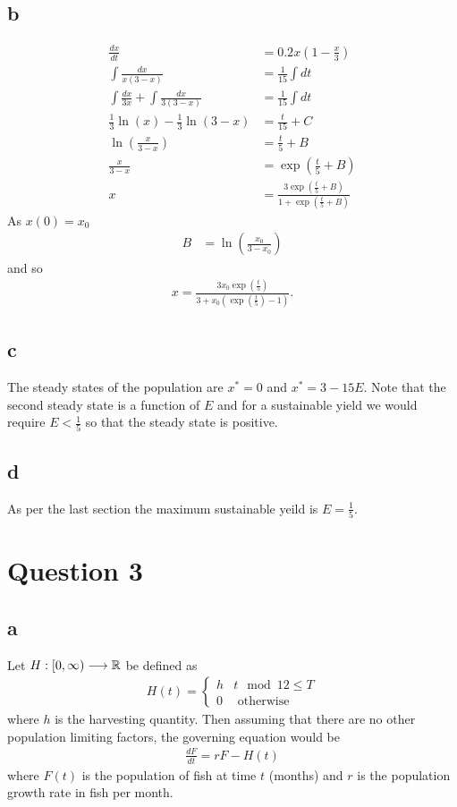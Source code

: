 \documentclass{unswmaths}
\begin{document}
\subsection*{b}
	\begin{align*}
		\frac{dx}{dt} &= 0.2x\left( 1 - \frac{x}{3} \right) \\
		\int \frac{dx}{x(3-x)} &= \frac{1}{15} \int dt \\
		\int \frac{dx}{3x} + \int \frac{dx}{3(3-x)} &= \frac{1}{15} \int dt \\
		\frac{1}{3} \ln(x) - \frac{1}{3} \ln(3-x) &= \frac{t}{15} + C \\
		\ln \left( \frac{x}{3-x} \right) &= \frac{t}{5} + B \\
		\frac{x}{3-x} &= \exp(\frac{t}{5} + B) \\
		x &= \frac{3\exp(\frac{t}{5} + B)}{1 + \exp(\frac{t}{5} + B)}
	\end{align*}
	As $ x(0) = x_0 $
	\begin{align*}
		B &= \ln \left( \frac{x_0}{3-x_0} \right)
	\end{align*}
	and so
	\begin{align*}
		x = \frac{3 x_0 \exp(\frac{t}{5})}{3 + x_0 (\exp(\frac{t}{5}) - 1)}.
	\end{align*}
\subsection*{c}
	The steady states of the population are
	$ x^* = 0 $ and $ x^* = 3 - 15E $. Note that the second steady state is a function of $ E $ and for a sustainable yield we would require $ E < \frac{1}{5} $ so that the steady state is positive.
	
\subsection*{d}
	As per the last section the maximum sustainable yeild is $ E = \frac{1}{5} $.

\section*{Question 3}
\subsection*{a}
Let $ H : [0, \infty) \longrightarrow \mathbb{R} $ be defined as
\begin{align*}
    H(t) = 
    \begin{cases}
        h & t \mod 12 \leq T \\
        0 & \text{ otherwise }
    \end{cases}
\end{align*}
where $ h $ is the harvesting quantity. 
Then assuming that there are no other population limiting factors, the governing equation would be
\begin{align*}
    \frac{dF}{dt} = rF - H(t)
\end{align*}
where $ F(t) $ is the population of fish at time $ t $ (months) and $ r $ is the population growth rate in fish per month.
\end{document}
